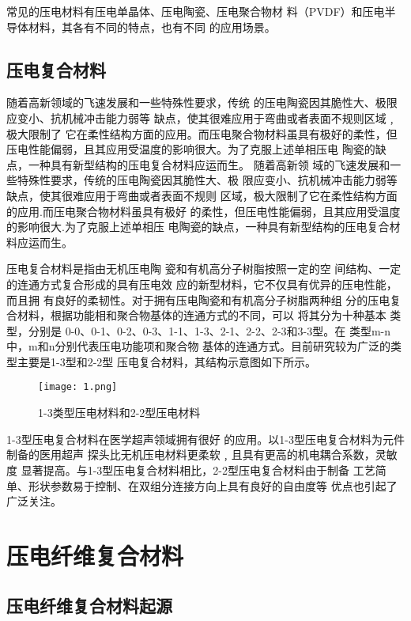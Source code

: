 \documentclass[lang=cn,11pt,a4paper,cite=authoryear]{elegantpaper}
\begin{document}
常见的压电材料有压电单晶体、压电陶瓷、压电聚合物材
料（PVDF）和压电半导体材料，其各有不同的特点，也有不同
的应用场景。

\subsection{压电复合材料}

随着高新领域的飞速发展和一些特殊性要求，传统
的压电陶瓷因其脆性大、极限应变小、抗机械冲击能力弱等
缺点，使其很难应用于弯曲或者表面不规则区域﹐极大限制了
它在柔性结构方面的应用。而压电聚合物材料虽具有极好的柔性，但
压电性能偏弱，且其应用受温度的影响很大。为了克服上述单相压电
陶瓷的缺点，一种具有新型结构的压电复合材料应运而生。 随着高新领
域的飞速发展和一些特殊性要求，传统的压电陶瓷因其脆性大、极
限应变小、抗机械冲击能力弱等缺点，使其很难应用于弯曲或者表面不规则
区域，极大限制了它在柔性结构方面的应用.而压电聚合物材料虽具有极好
的柔性，但压电性能偏弱，且其应用受温度的影响很大.为了克服上述单相压
电陶瓷的缺点，一种具有新型结构的压电复合材料应运而生。

压电复合材料是指由无机压电陶
瓷和有机高分子树脂按照一定的空
间结构、一定的连通方式复合形成的具有压电效
应的新型材料，它不仅具有优异的压电性能，而且拥
有良好的柔韧性。对于拥有压电陶瓷和有机高分子树脂两种组
分的压电复合材料，根据功能相和聚合物基体的连通方式的不同，可以
将其分为十种基本
类型，分别是 0-0、0-1、0-2、0-3、1-1、1-3、2-1、2-2、2-3和3-3型。在
类型m-n中，m和n分别代表压电功能项和聚合物
基体的连通方式。目前研究较为广泛的类型主要是1-3型和2-2型
压电复合材料，其结构示意图如下所示。


\begin{figure}[htbp]
  \centering
  \texttt{[image: 1.png]}
  \caption{1-3类型压电材料和2-2型压电材料}
\end{figure}

1-3型压电复合材料在医学超声领域拥有很好
的应用。以1-3型压电复合材料为元件制备的医用超声
探头比无机压电材料更柔软﹐且具有更高的机电耦合系数，灵敏度
显著提高。与1-3型压电复合材料相比，2-2型压电复合材料由于制备
工艺简单、形状参数易于控制、在双组分连接方向上具有良好的自由度等
优点也引起了广泛关注。


\section{压电纤维复合材料}

\subsection{压电纤维复合材料起源}
\end{document}

